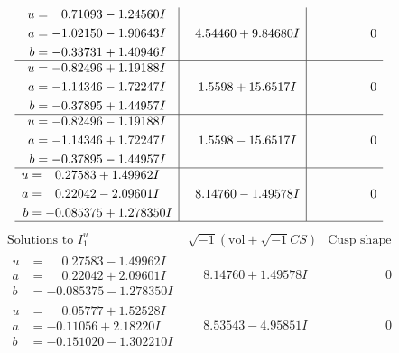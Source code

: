 \documentclass[1p]{elsarticle_modified}
\theoremstyle{definition}
\newcommand{\I}{\sqrt{-1}}
\begin{document}
$$\begin{array}{c|c|c}
\begin{aligned}
u &= \phantom{-}0.71093 - 1.24560 I \\
a &= -1.02150 - 1.90643 I \\
b &= -0.33731 + 1.40946 I\end{aligned}
 & \phantom{-}4.54460 + 9.84680 I & \phantom{-0.000000 } 0 \\ \hline\begin{aligned}
u &= -0.82496 + 1.19188 I \\
a &= -1.14346 - 1.72247 I \\
b &= -0.37895 + 1.44957 I\end{aligned}
 & \phantom{-}1.5598 + 15.6517 I & \phantom{-0.000000 } 0 \\ \hline\begin{aligned}
u &= -0.82496 - 1.19188 I \\
a &= -1.14346 + 1.72247 I \\
b &= -0.37895 - 1.44957 I\end{aligned}
 & \phantom{-}1.5598 - 15.6517 I & \phantom{-0.000000 } 0 \\ \hline\begin{aligned}
u &= \phantom{-}0.27583 + 1.49962 I \\
a &= \phantom{-}0.22042 - 2.09601 I \\
b &= -0.085375 + 1.278350 I\end{aligned}
 & \phantom{-}8.14760 - 1.49578 I & \phantom{-0.000000 } 0\\
 \hline 
 \end{array}$$\newpage$$\begin{array}{c|c|c}  
\text{Solutions to }I^u_{1}& \I (\text{vol} + \sqrt{-1}CS) & \text{Cusp shape}\\
 \hline 
\begin{aligned}
u &= \phantom{-}0.27583 - 1.49962 I \\
a &= \phantom{-}0.22042 + 2.09601 I \\
b &= -0.085375 - 1.278350 I\end{aligned}
 & \phantom{-}8.14760 + 1.49578 I & \phantom{-0.000000 } 0 \\ \hline\begin{aligned}
u &= \phantom{-}0.05777 + 1.52528 I \\
a &= -0.11056 + 2.18220 I \\
b &= -0.151020 - 1.302210 I\end{aligned}
 & \phantom{-}8.53543 - 4.95851 I & \phantom{-0.000000 } 0 \\ \hline\begin{aligned}

\end{aligned}
\end{array}$$
\end{document}
